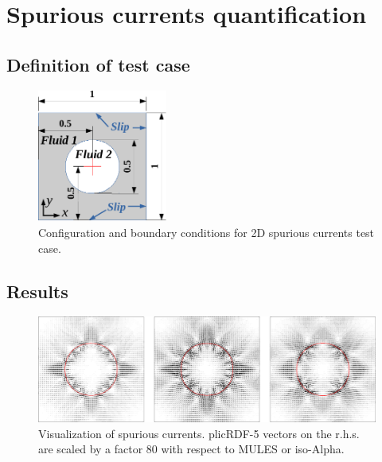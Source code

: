 \documentclass[review]{elsarticle}
\begin{document}
\section{Spurious currents quantification}\label{sec_spuriouscase}

\subsection{Definition of test case}\label{sec_spuriouscasedef}

\begin{figure}[!h]
\begin{center}
 \vspace{-1mm}
 \includegraphics[width=4.25cm]{figures/spuriousCurrents_scheme.pdf}
 \vspace{-7mm}
\end{center}
\caption{Configuration and boundary conditions for 2D spurious currents test case.}
\label{fig:spuriousCurrents_scheme}
\end{figure}



\subsection{Results}\label{sec_spuriousresults}


\begin{figure}[!h]
\begin{center}
 \vspace{-1mm}
 \includegraphics[width=\textwidth]{figures/spuriousCurrents_MULES_vs_isoAlpha_vs_plicRDF-5-scaleX80_time=1p5_080x160.png}
 \vspace{-7mm}
\end{center}
\caption{Visualization of spurious currents. plicRDF-5 vectors on the r.h.s. are scaled by a factor 80 with respect to MULES or iso-Alpha.}
\label{fig:spuriousCurrents_velocityField}
\end{figure}
\end{document}
